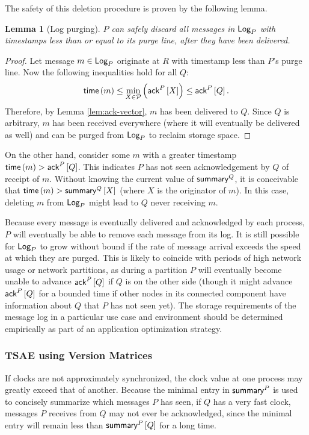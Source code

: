 \documentclass[]             %
{NASA}                       %
\newtheorem{lemma}[theorem]{Lemma}
\theoremstyle{definition}
\begin{document}
The safety of this deletion procedure is proven by the following
lemma.
\begin{lemma}[Log purging]
  \label{lem:purge}
  $P$ can safely discard all messages in $\textsf{Log}_{P}$ with timestamps less
  than or equal to its purge line, after they have been delivered.
\end{lemma}
\begin{proof}
  Let message $m \in \textsf{Log}_{P}$ originate at $R$ with timestamp less than
  $P$'s purge line. Now the following inequalities hold for all $Q$:
  \[ \mathsf{time}\left(m\right) \leq \min_{X \in \mathcal{P}}\left(\textsf{ack}^{P}\left[X\right]\right)
    \leq \textsf{ack}^{P}\left[Q\right].\] Therefore, by Lemma \ref{lem:ack-vector}, $m$
  has been delivered to $Q$. Since $Q$ is arbitrary, $m$ has been
  received everywhere (where it will eventually be delivered as well)
  and can be purged from $\textsf{Log}_{P}$ to reclaim storage space.
\end{proof}
On the other hand, consider some $m$ with a greater timestamp
$\mathsf{time}\left(m\right) > \textsf{ack}^{P}\left[Q\right]$. This indicates $P$ has not seen
acknowledgement by $Q$ of receipt of $m$. Without knowing the current
value of $\textsf{summary}^{Q}$, it is conceivable that
$\mathsf{time}\left(m\right) > \textsf{summary}^{Q}\left[X\right]$ (where $X$ is the originator of $m$).
In this case, deleting $m$ from $\textsf{Log}_{P}$ might lead to $Q$ never
receiving $m$.

Because every message is eventually delivered and acknowledged by each
process, $P$ will eventually be able to remove each message from its
log. It is still possible for $\textsf{Log}_{P}$ to grow without bound if the
rate of message arrival exceeds the speed at which they are
purged. This is likely to coincide with periods of high network usage
or network partitions, as during a partition $P$ will eventually
become unable to advance $\textsf{ack}^{P}\left[Q\right]$ if $Q$ is on the other side
(though it might advance $\textsf{ack}^{P}\left[Q\right]$ for a bounded time if other
nodes in its connected component have information about $Q$ that $P$
has not seen yet). The storage requirements of the message log in a
particular use case and environment should be determined empirically
as part of an application optimization strategy.

\subsubsection{TSAE using Version Matrices}
\label{sssec:tsae-unsynchronized}
If clocks are not approximately synchronized, the clock value at one
process may greatly exceed that of another. Because the minimal entry
in $\textsf{summary}^{P}$ is used to concisely summarize which messages $P$
has seen, if $Q$ has a very fast clock, messages $P$ receives from $Q$
may not ever be acknowledged, since the minimal entry will remain less
than $\textsf{summary}^{P}\left[Q\right]$ for a long time.
\end{document}
